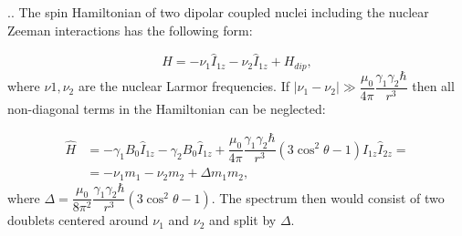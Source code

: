 \documentclass[handout]{beamer}
\begin{document}
\begin{frame}{\thesection.\thesubsection. \insertsubsection}
	The spin Hamiltonian of two dipolar coupled nuclei including the nuclear Zeeman interactions has the following form:
	
	\begin{equation}
	  \hat{H} = -\nu_1 \hat{I}_{1z} -\nu_2 \hat{I}_{1z}  + H_{dip},
	\end{equation}
    where $\nu1,\nu_2$ are the nuclear Larmor frequencies. If  $\mid \nu_1 -\nu_2 \mid \gg \dfrac{\mu_0}{4 \pi} \dfrac{\gamma_1 \gamma_2 \hbar}{r^3}$ then all non-diagonal terms in the Hamiltonian can be neglected:
	
	\begin{align}
	\hat{H} &= -\gamma_1 B_0 \hat{I}_{1z} -\gamma_2 B_0 \hat{I}_{1z}  + \dfrac{\mu_0}{4 \pi} \dfrac{\gamma_1 \gamma_2 \hbar}{r^3} (3 \cos^2 \theta -1)  \hat{I}_{1z} \hat{I}_{2z} =  \\
	&= -\nu_1 m_1 - \nu_2 m_2 + \Delta m_1 m_2,
	\end{align}
	where $\Delta = \dfrac{\mu_0}{8 \pi^2} \dfrac{\gamma_1 \gamma_2 \hbar}{r^3} (3 \cos^2 \theta -1)$.
	The spectrum then would consist of two doublets centered around $\nu_1$ and $\nu_2$ and split by $\Delta$.
	
	
	
	

    
\end{frame}
\end{document}
